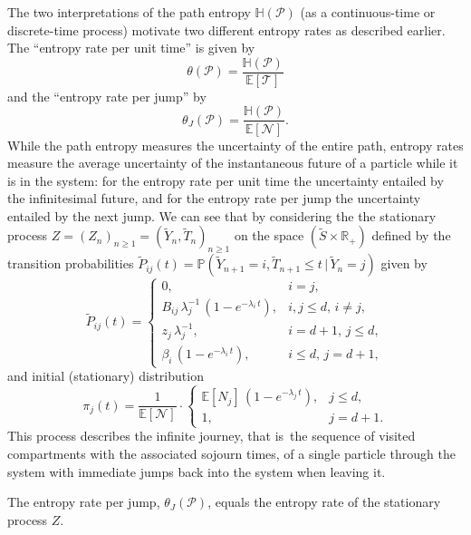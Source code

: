 \documentclass[smallextended]{svjour3}
\newcommand{\R}{\mathbb{R}}
\renewcommand{\P}{\mathbb{P}}
\newcommand{\E}{\mathbb{E}}
\newcommand{\TT}{\mathcal{T}}
\renewcommand{\H}{\mathbb{H}}
\newcommand{\ie}{that is}
\renewcommand{\emph}[1]{``#1''}
\begin{document}
The two interpretations of the path entropy $\H(\mathcal{P})$ (as a continuous-time or discrete-time process) motivate two different entropy rates as described earlier.
The \emph{entropy rate per unit time} is given by
\begin{equation}
  \theta(\mathcal{P}) = \frac{\H(\mathcal{P})}{\E\left[\TT\right]}
\end{equation}
and the \emph{entropy rate per jump} by
\begin{equation}
  \theta_J(\mathcal{P}) = \frac{\H(\mathcal{P})}{\E\left[\mathcal{N}\right]}.
\end{equation}
While the path entropy measures the uncertainty of the entire path, entropy rates measure the average uncertainty of the instantaneous future of a particle while it is in the system: for the entropy rate per unit time the uncertainty entailed by the infinitesimal future, and for the entropy rate per jump the uncertainty entailed by the next jump. 
We can see that by considering the the stationary process
$Z=(Z_n)_{n\geq1}=(\widetilde{Y}_n,\widetilde{T}_n)_{n\geq1}$ on the space $(\widetilde{S}\times\R_+)$ defined by the transition probabilities $\widetilde{P}_{ij}(t) = \P(\widetilde{Y}_{n+1}=i, \widetilde{T}_{n+1}\leq t\,|\,\widetilde{Y}_n=j)$ given by
\begin{equation}
  \widetilde{P}_{ij}(t) = 
  \begin{cases}
     0, & i=j,\\
     B_{ij}\,\lambda_j^{-1}\,(1-e^{-\lambda_i\,t}), & i,j\leq d,\,i\neq j,\\
     z_j\,\lambda_j^{-1}, & i=d+1,\,j\leq d,\\
     \beta_i\,(1-e^{-\lambda_i\,t}), & i\leq d,\,j=d+1,
  \end{cases}
\end{equation}
and initial (stationary) distribution
\begin{equation}
  \pi_j(t) = \frac{1}{\E\left[\mathcal{N}\right]}\cdot
  \begin{cases}
    \E\left[N_j\right]\,(1-e^{-\lambda_j\,t}), & j\leq d,\\
    1, & j=d+1.
  \end{cases}
\end{equation}
This process describes the infinite journey, \ie\ the sequence of visited compartments with the associated sojourn times, of a single particle through the system with immediate jumps back into the system when leaving it.

\begin{myproposition}
  The entropy rate per jump, $\theta_J(\mathcal{P})$, equals the entropy rate of the stationary process $Z$.
\end{myproposition}
\end{document}
